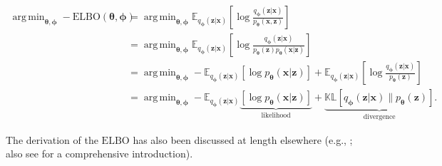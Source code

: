 \documentclass[11pt,a4paper,oneside]{book}
\DeclareMathOperator*{\argmin}{arg\,min}
\begin{document}
\begin{doublespace}
\begin{appendices}
\begin{subequations}
\begin{align}
    \argmin_{\boldsymbol{\theta}, \boldsymbol{\phi}}-\mathrm{ELBO}(\boldsymbol{\theta}, \boldsymbol{\phi}) &= \argmin_{\boldsymbol{\theta}, \boldsymbol{\phi}} \mathbb{E}_{    q_{\boldsymbol{\phi}}(\mathbf{z} | \mathbf{x})}\left[ \log\frac{q_{\boldsymbol{\phi}}(\mathbf{z} | \mathbf{x})}{p_{\boldsymbol{\theta}}(\mathbf{x}, \mathbf{z})}\right] \\
    &= \argmin_{\boldsymbol{\theta}, \boldsymbol{\phi}} \mathbb{E}_{    q_{\boldsymbol{\phi}}(\mathbf{z} | \mathbf{x})}\left[ \log\frac{q_{\boldsymbol{\phi}}(\mathbf{z} | \mathbf{x})}{p_{\boldsymbol{\theta}}(\mathbf{z})p_{\boldsymbol{\theta}}(\mathbf{x} | \mathbf{z})}\right] \\ 
    &= \argmin_{\boldsymbol{\theta}, \boldsymbol{\phi}} -\mathbb{E}_{    q_{\boldsymbol{\phi}}(\mathbf{z} | \mathbf{x})}\left[ \log p_{\boldsymbol{\theta}}(\mathbf{x} | \mathbf{z})\right] + \mathbb{E}_{    q_{\boldsymbol{\phi}}(\mathbf{z} | \mathbf{x})}\left[ \log\frac{q_{\boldsymbol{\phi}}(\mathbf{z} | \mathbf{x})}{p_{\boldsymbol{\theta}}(\mathbf{z})}\right] \label{eq:expected_elbo}\\
    &= \argmin_{\boldsymbol{\theta}, \boldsymbol{\phi}} -\mathbb{E}_{q_{\boldsymbol{\phi}}(\mathbf{z} | \mathbf{x})}\underbrace{\left[\log p_{\boldsymbol{\theta}}(\mathbf{x} | \mathbf{z})\right]}_{\textrm{likelihood}} + \underbrace{\mathbb{KL}[q_{\boldsymbol{\phi}}(\mathbf{z} | \mathbf{x}) \| p_{\boldsymbol{\theta}}(\mathbf{z})]}_{\textrm{divergence}}. \label{eq:elbo_2}
\end{align}
\end{subequations}

The derivation of the $\mathrm{ELBO}$ has also been discussed at length elsewhere (e.g., \citealt{kingma2013vae, kingma2014semi, burda2015iwae, alemi2016deep, dilokthanakul2016gmvae, alemi2017fixing, ding2018scvis}; also see \citealt{kingma2019introduction} for a comprehensive introduction).



\end{appendices}
\end{doublespace}
\end{document}
